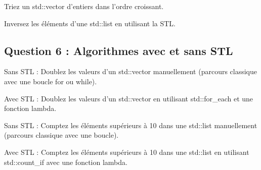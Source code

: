 
\begin{DoxyEnumerate}
\item Triez un std\+::vector d’entiers dans l’ordre croissant.
\item Inversez les éléments d’une std\+::list en utilisant la S\+TL.
\end{DoxyEnumerate}

\subsection*{Question 6 \+: Algorithmes avec et sans S\+TL}


\begin{DoxyEnumerate}
\item Sans S\+TL \+: Doublez les valeurs d’un std\+::vector manuellement (parcours classique avec une boucle for ou while).
\item Avec S\+TL \+: Doublez les valeurs d’un std\+::vector en utilisant std\+::for\+\_\+each et une fonction lambda.
\item Sans S\+TL \+: Comptez les éléments supérieurs à 10 dans une std\+::list manuellement (parcours classique avec une boucle).
\item Avec S\+TL \+: Comptez les éléments supérieurs à 10 dans une std\+::list en utilisant std\+::count\+\_\+if avec une fonction lambda. 
\end{DoxyEnumerate}